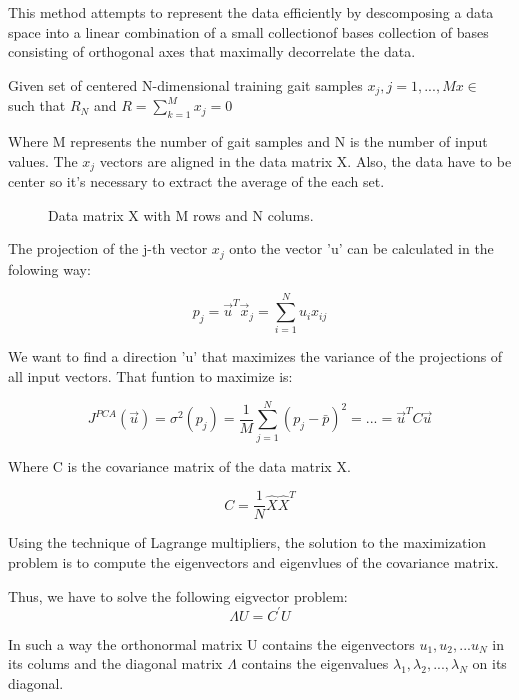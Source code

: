 This method attempts to represent the data efficiently by descomposing a data space into a linear combination of a small collectionof bases collection of bases consisting of orthogonal axes that maximally decorrelate the data\cite{Jeon}.

Given  set of centered N-dimensional training gait samples 
$ x_{j}, j=1,...,M     x \in$ such that $ R_{N} $ and $ R=\sum_{k=1}^{M}x_{j}=0 $
	
Where M represents the number of gait samples and N is the number of input values. The $ x_{j} $ vectors are aligned in the data matrix X. Also, the data have to be center so it's necessary to extract the average of the each set.
\begin{figure}[H]
	\centering
	\caption{Data matrix X with M rows and N colums.}
	\label{fig:matrixPCA}
\end{figure}

The projection of the j-th vector $ x_{j} $ onto the vector 'u' can be calculated in the folowing way:

\begin{equation}
	\label{projections}
	p_{j}=\overrightarrow{u}^{T}\overrightarrow{x}_{j}=\sum_{i=1}^{N}u_{i}x_{ij}	
\end{equation}

We want to find a direction 'u' that maximizes the variance of the projections of all input vectors. That funtion to maximize is:

\begin{equation}
	\label{maxfunction}
	J^{PCA}(\overrightarrow{u})=\sigma^{2}(p_{j})=\dfrac{1}{M}\sum_{j=1}^{N}(p_{j}-\bar{p})^{2}=...=\overrightarrow{u}^{T}C\overrightarrow{u}	
\end{equation}

Where C is the covariance matrix of the data matrix X.

$$C=\dfrac{1}{N}\hat{X}\hat{X}^{T}$$

Using the technique of Lagrange multipliers, the solution to the maximization problem is to compute the eigenvectors and eigenvlues of the covariance matrix.

Thus, we have to solve the following eigvector problem:
\begin{equation}
	\label{eigenproblem}
	\Lambda U=C^{'} U
\end{equation}

In such a way the orthonormal matrix U contains the eigenvectors $u_{1}, u_{2},...u_{N}$ in its colums and the diagonal matrix $\Lambda$ contains the eigenvalues $\lambda_{1}, \lambda_{2},...,\lambda_{N}$ on its diagonal.

